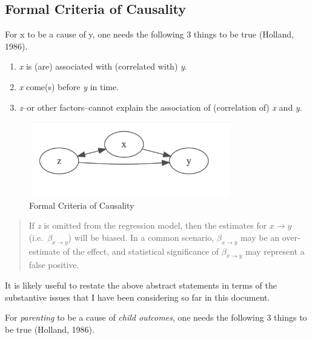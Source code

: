 \documentclass[
  letterpaper,
  DIV=11,
  numbers=noendperiod]{scrreprt}
\providecommand{\tightlist}{%
  \setlength{\itemsep}{0pt}\setlength{\parskip}{0pt}}\usepackage{longtable,booktabs,array}
\begin{document}
\hypertarget{formal-criteria-of-causality}{%
\subsection{Formal Criteria of
Causality}\label{formal-criteria-of-causality}}

For x to be a cause of y, one needs the following 3 things to be true
(Holland, 1986).

\begin{enumerate}
\def\labelenumi{\arabic{enumi}.}
\tightlist
\item
  \emph{x} is (are) associated with (correlated with) \emph{y}.
\item
  \emph{x} come(s) before \emph{y} in time.
\item
  \emph{z}--or other factors--cannot explain the association of
  (correlation of) \emph{x} and \emph{y}.
\end{enumerate}

\begin{figure}

{\centering \includegraphics[width=3.46in,height=\textheight]{fig-causality.png}

}

\caption{\label{fig-causality}Formal Criteria of Causality}

\end{figure}

\begin{quote}
If \emph{z} is omitted from the regression model, then the estimates for
\(x \rightarrow y\) (i.e.~\(\beta_{x \rightarrow y}\)) will be biased.
In a common scenario, \(\beta_{x \rightarrow y}\) may be an
over-estimate of the effect, and statistical significance of
\(\beta_{x \rightarrow y}\) may represent a false positive.
\end{quote}

It is likely useful to restate the above abstract statements in terms of
the substantive issues that I have been considering so far in this
document.

For \emph{parenting} to be a cause of \emph{child outcomes}, one needs
the following 3 things to be true (Holland, 1986).
\end{document}
